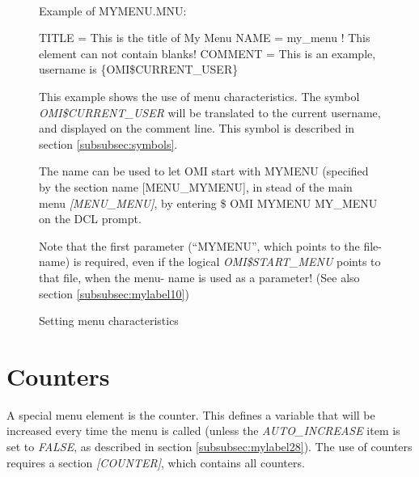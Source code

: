 \documentclass[a4paper]{book}
\renewcommand{\indent}{\hspace*{5mm}}
\begin{document}
\begin{figure}[h!tb]
\begin{minipage}[h!tb]{\textwidth}
\hrulefill \\
\noindent Example of MYMENU.MNU: \newline
\begin{ttfamily}
 \newline
\indent TITLE = This is the title of My Menu \newline
\indent NAME = my{\_}menu ! This element can not contain blanks! \newline
\indent COMMENT = This is an example, username is {\{}OMI{\$}CURRENT{\_}USER{\}} \newline
\end{ttfamily}
\noindent This example shows the use of menu characteristics. The symbol 
\textsl{OMI{\$}CURRENT{\_}USER} will be translated to the current username, and 
displayed on the comment line. This symbol is described in section \ref{subsubsec:symbols}.

The name can be used to let OMI start with MYMENU (specified by the section 
name [MENU{\_}MYMENU], in stead of the main menu \textsl{[MENU{\_}MENU]}, by entering \newline
\indent \textsf{{\$} OMI MYMENU MY{\_}MENU} \newline
on the DCL prompt.

Note that the first parameter (``MYMENU'', which points to the file- name) is 
required, even if the logical \textsl{OMI{\$}START{\_}MENU} points to that file, when 
the menu- name is used as a parameter! (See also section \ref{subsubsec:mylabel10})
\caption{Setting menu characteristics}
\hrulefill
\end{minipage}
\end{figure}

\section{Counters}
\label{subsec:counters}

A special menu element is the counter. This defines a variable that will be 
increased every time the menu is called (unless the \textsl{AUTO{\_}INCREASE} item is 
set to \textsl{FALSE}, as described in section \ref{subsubsec:mylabel28}).
The use of counters requires a section \textsl{[COUNTER]}, which contains all counters.
\end{document}
